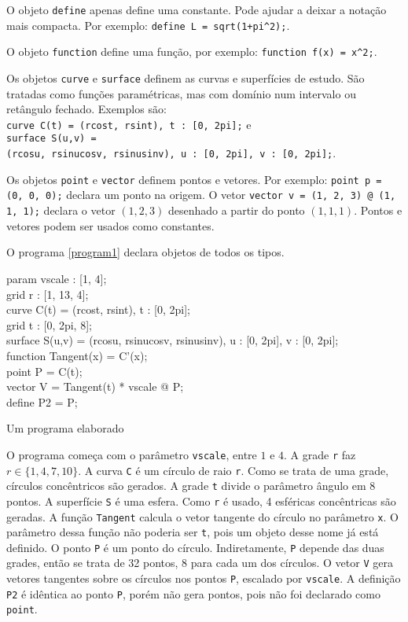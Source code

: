 \documentclass[10pt,a4paper]{article}
\begin{document}
O objeto \texttt{define} apenas define uma constante.
Pode ajudar a deixar a notação mais compacta. Por exemplo: \texttt{define L = sqrt(1+pi\textasciicircum 2);}.

O objeto \texttt{function} define uma função, por exemplo: \texttt{function f(x) = x\textasciicircum 2;}.

Os objetos \texttt{curve} e \texttt{surface} definem as curvas e superfícies de estudo.
São tratadas como funções paramétricas, mas com domínio num intervalo ou retângulo fechado.
Exemplos são: \\ \texttt{curve C(t) = (rcost, rsint), t : [0, 2pi];} e
\\ \texttt{surface S(u,v) = \\ (rcosu, rsinucosv, rsinusinv), u : [0, 2pi], v : [0, 2pi];}.

Os objetos \texttt{point} e \texttt{vector} definem pontos e vetores.
Por exemplo: \texttt{point p = (0, 0, 0);} declara um ponto na origem.
O vetor \texttt{vector v = (1, 2, 3) @ (1, 1, 1);} declara o vetor $(1,2,3)$ desenhado a partir do ponto $(1,1,1)$.
Pontos e vetores podem ser usados como constantes.


\newpage
O programa \ref{program1} declara objetos de todos os tipos.

\begin{listing}
param vscale : [1, 4];\\
grid r : [1, 13, 4];\\
curve C(t) = (rcost, rsint), t : [0, 2pi];\\
grid t : [0, 2pi, 8];\\
surface S(u,v) = (rcosu, rsinucosv, rsinusinv), u : [0, 2pi], v : [0, 2pi];\\
function Tangent(x) = C'(x);\\
point P = C(t);\\
vector V = Tangent(t) * vscale @ P;\\
define P2 = P;
\caption{Um programa elaborado}
\label{program1}
\end{listing}

O programa começa com o parâmetro \texttt{vscale}, entre $1$ e $4$.
A grade \texttt{r} faz $r \in \{1, 4, 7, 10\}$.
A curva \texttt{C} é um círculo de raio \texttt{r}.
Como se trata de uma grade, círculos concêntricos são gerados.
A grade \texttt{t} divide o parâmetro ângulo em 8 pontos.
A superfície \texttt{S} é uma esfera. Como \texttt{r} é usado, 4 esféricas concêntricas são geradas.
A função \texttt{Tangent} calcula o vetor tangente do círculo no parâmetro \texttt{x}.
O parâmetro dessa função não poderia ser \texttt{t}, pois um objeto desse nome já está definido.
O ponto \texttt{P} é um ponto do círculo.
Indiretamente, \texttt{P} depende das duas grades, então se trata de 32 pontos, 8 para cada um dos círculos.
O vetor \texttt{V} gera vetores tangentes sobre os círculos nos pontos \texttt{P}, escalado por \texttt{vscale}.
A definição \texttt{P2} é idêntica ao ponto \texttt{P}, porém não gera pontos, pois não foi declarado como \texttt{point}.
\end{document}
